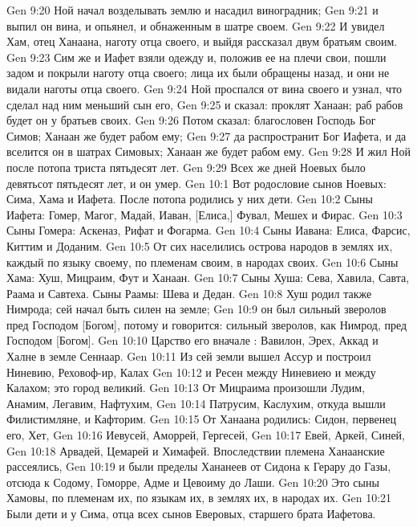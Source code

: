 \rsbpar\vs Gen 9:20 Ной начал возделывать землю и насадил виноградник;
\vs Gen 9:21 и выпил он вина, и опьянел, и  обнаженным в шатре своем.
\vs Gen 9:22 И увидел Хам, отец Ханаана, наготу отца своего, и выйдя рассказал двум братьям своим.
\vs Gen 9:23 Сим же и Иафет взяли одежду и, положив ее на плечи свои, пошли задом и покрыли наготу отца своего; лица их были обращены назад, и они не видали наготы отца своего.
\vs Gen 9:24 Ной проспался от вина своего и узнал, что сделал над ним меньший сын его,
\vs Gen 9:25 и сказал: проклят Ханаан; раб рабов будет он у братьев своих.
\vs Gen 9:26 Потом сказал: благословен Господь Бог Симов; Ханаан же будет рабом ему;
\vs Gen 9:27 да распространит Бог Иафета, и да вселится он в шатрах Симовых; Ханаан же будет рабом ему.
\rsbpar\vs Gen 9:28 И жил Ной после потопа триста пятьдесят лет.
\vs Gen 9:29 Всех же дней Ноевых было девятьсот пятьдесят лет, и он умер.
\vs Gen 10:1 Вот родословие сынов Ноевых: Сима, Хама и Иафета. После потопа родились у них дети.
\rsbpar\vs Gen 10:2 Сыны Иафета: Гомер, Магог, Мадай, Иаван, [Елиса,] Фувал, Мешех и Фирас.
\vs Gen 10:3 Сыны Гомера: Аскеназ, Рифат и Фогарма.
\vs Gen 10:4 Сыны Иавана: Елиса, Фарсис, Киттим и Доданим.
\vs Gen 10:5 От сих населились острова народов в землях их, каждый по языку своему, по племенам своим, в народах своих.
\rsbpar\vs Gen 10:6 Сыны Хама: Хуш, Мицраим, Фут и Ханаан.
\vs Gen 10:7 Сыны Хуша: Сева, Хавила, Савта, Раама и Савтеха. Сыны Раамы: Шева и Дедан.
\vs Gen 10:8 Хуш родил также Нимрода; сей начал быть силен на земле;
\vs Gen 10:9 он был сильный зверолов пред Господом [Богом], потому и говорится: сильный зверолов, как Нимрод, пред Господом [Богом].
\vs Gen 10:10 Царство его вначале : Вавилон, Эрех, Аккад и Халне в земле Сеннаар.
\vs Gen 10:11 Из сей земли вышел Ассур и построил Ниневию, Реховоф-ир, Калах
\vs Gen 10:12 и Ресен между Ниневиею и между Калахом; это город великий.
\vs Gen 10:13 От Мицраима произошли Лудим, Анамим, Легавим, Нафтухим,
\vs Gen 10:14 Патрусим, Каслухим, откуда вышли Филистимляне, и Кафторим.
\vs Gen 10:15 От Ханаана родились: Сидон, первенец его, Хет,
\vs Gen 10:16 Иевусей, Аморрей, Гергесей,
\vs Gen 10:17 Евей, Аркей, Синей,
\vs Gen 10:18 Арвадей, Цемарей и Химафей. Впоследствии племена Ханаанские рассеялись,
\vs Gen 10:19 и были пределы Хананеев от Сидона к Герару до Газы, отсюда к Содому, Гоморре, Адме и Цевоиму до Лаши.
\vs Gen 10:20 Это сыны Хамовы, по племенам их, по языкам их, в землях их, в народах их.
\rsbpar\vs Gen 10:21 Были дети и у Сима, отца всех сынов Еверовых, старшего брата Иафетова.
